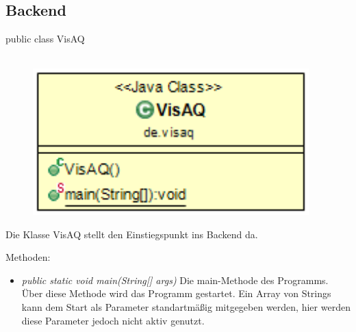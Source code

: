 \subsection{Backend}
public class VisAQ
\\\\
\begin{minipage}{0.3\textwidth}
    \begin{figure}[H]
        {\centering\includegraphics[width=0.95\textwidth]{media/backend/classes/VisAQ.png}}
    \end{figure}
    \end{minipage} \hfill
\begin{minipage}{0.7\textwidth}
    Die Klasse VisAQ stellt den Einstiegspunkt ins Backend da.
\end{minipage}

Methoden:
\begin{itemize}
    \item \emph{public static void main(String[] args)} Die main-Methode des Programms.
    Über diese Methode wird das Programm gestartet. Ein Array von Strings kann dem Start als Parameter standartmäßig mitgegeben werden, hier werden diese Parameter jedoch nicht aktiv genutzt.
\end{itemize}

